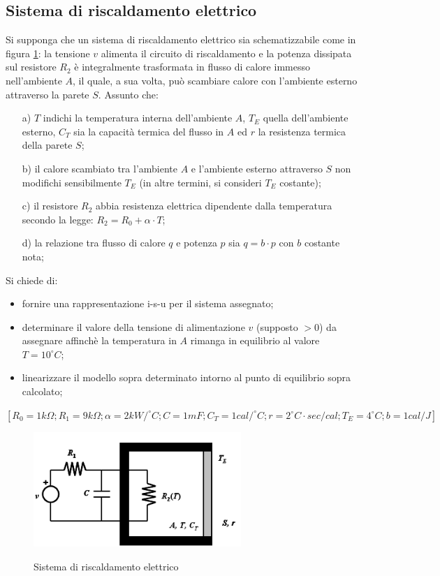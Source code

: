 \documentclass[a4paper]{report}
\begin{document}
\subsection{Sistema di riscaldamento elettrico}
Si supponga che un sistema di riscaldamento elettrico sia
schematizzabile come in figura \ref{fig:esempio01}: la tensione $v$
alimenta il circuito di riscaldamento e la potenza dissipata sul
resistore $R_2$ \`e integralmente trasformata in flusso di calore
immesso nell'ambiente $A$, il quale, a sua volta, pu\`o scambiare
calore con l'ambiente esterno attraverso la parete $S$. Assunto che:
\begin{itemize}
  \item[a)] $T$ indichi la temperatura interna dell'ambiente $A$, $T_E$
  quella dell'ambiente esterno, $C_T$ sia la capacit\`a termica del
  flusso in $A$ ed $r$ la resistenza termica della parete $S$;
  \item[b)] il calore scambiato tra l'ambiente $A$ e l'ambiente
    esterno attraverso $S$ non modifichi sensibilmente $T_E$ (in altre
    termini, si consideri $T_E$ costante);
  \item[c)] il resistore $R_2$ abbia resistenza elettrica dipendente
    dalla temperatura secondo la legge: $R_2 = R_0 + \alpha \cdot T$;
  \item[d)] la relazione tra flusso di calore $q$ e potenza $p$ sia $q
    = b \cdot p$ con $b$ costante nota;
\end{itemize}

Si chiede di:
\begin{itemize}
\item fornire una rappresentazione i-s-u per il sistema assegnato;
\item determinare il valore della tensione di alimentazione $v$
  (supposto $> 0$) da assegnare affinch\`e la temperatura in $A$
  rimanga in equilibrio al valore $T = 10^{\circ}C$;
\item linearizzare il modello sopra determinato intorno al punto di
  equilibrio sopra calcolato;
\end{itemize}
$[R_0 = 1 k\Omega; R_1 = 9 k\Omega; \alpha = 2 kW/^{\circ}C; C = 1 mF; C_T = 1
  cal/^{\circ}C; r = 2 ^{\circ}C \cdot sec/cal; T_E= 4 ^{\circ}C; b = 1
  cal/J]$
\begin{figure}[!h]
  \centering
  \includegraphics[width=0.7\textwidth]{./images/esempio01.png}
  \label{fig:esempio01}
  \caption{Sistema di riscaldamento elettrico\label{fig:esempio01}}
\end{figure}
\end{document}
